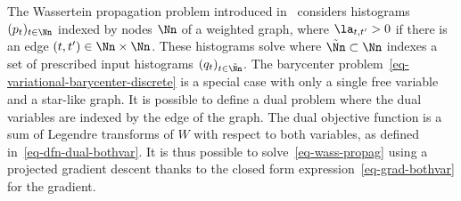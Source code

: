 The Wassertein propagation problem introduced in~\cite{Solomon-ICML} considers histograms $(p_t)_{t \in \Nn}$ indexed by nodes $\Nn$ of a weighted graph, where $\la_{t,t'} > 0$ if there is an edge $(t,t') \in \Nn \times \Nn$. These histograms solve
where $\tilde\Nn \subset \Nn$ indexes a set of prescribed input histograms $(q_t)_{t \in \tilde\Nn}$. 
The barycenter problem~\eqref{eq-variational-barycenter-discrete} is a special case with only a single free variable and a star-like graph.
%
It is possible to define a dual problem where the dual variables are indexed by the edge of the graph. The dual objective function is a sum of Legendre transforms of $W$ with respect to both variables, as defined in~\eqref{eq-dfn-dual-bothvar}. It is thus possible to solve~\eqref{eq-wass-propag} using a projected gradient descent thanks to the closed form expression~\eqref{eq-grad-bothvar} for the gradient.


